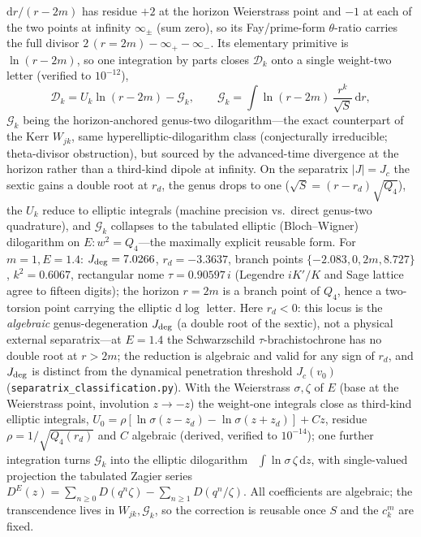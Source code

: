 \documentclass[
    aps, prd, twocolumn, superscriptaddress,
    showpacs, nofootinbib, floatfix
]{revtex4-2}
\newcommand{\Jc}{J_{c}}
\newcommand{\dd}{\mathrm{d}}
\begin{document}
$\dd r/(r-2m)$ has residue $+2$ at the horizon Weierstrass point and $-1$ at each of
the two points at infinity $\infty_\pm$ (sum zero), so its Fay/prime-form
$\theta$-ratio carries the full divisor $2\,(r{=}2m)-\infty_+-\infty_-$. Its
elementary primitive is $\ln(r-2m)$, so one integration by parts closes $\mathcal{D}_k$
onto a single weight-two letter (verified to $10^{-12}$),
\begin{equation}
    \mathcal{D}_k=U_k\ln(r-2m)-\mathcal{G}_k,\qquad
    \mathcal{G}_k=\int\ln(r-2m)\,\frac{r^k}{\sqrt S}\,\dd r,
    \label{eq:horizon-dilog}
\end{equation}
$\mathcal{G}_k$ being the horizon-anchored genus-two dilogarithm---the exact
counterpart of the Kerr $W_{jk}$, same hyperelliptic-dilogarithm class (conjecturally
irreducible; theta-divisor obstruction), but sourced by the advanced-time divergence at the
horizon rather than a third-kind dipole at infinity. On the separatrix $|J|=\Jc$ the
sextic gains a double root at $r_d$, the genus drops to one
($\sqrt S=(r-r_d)\sqrt{Q_4}$), the $U_k$ reduce to elliptic integrals (machine
precision vs.\ direct genus-two quadrature), and $\mathcal{G}_k$ collapses to the
tabulated elliptic (Bloch--Wigner) dilogarithm on $E:w^2=Q_4$---the maximally
explicit reusable form. For $m=1,E=1.4$: $J_{\rm deg}=7.0266$, $r_d=-3.3637$, branch points
$\{-2.083,0,2m,8.727\}$, $k^2=0.6067$, rectangular nome $\tau=0.90597\,i$ (Legendre
$iK'/K$ and Sage lattice agree to fifteen digits); the horizon $r=2m$ is a branch
point of $Q_4$, hence a two-torsion point carrying the elliptic $\dd\log$ letter.
Here $r_d<0$: this locus is the \emph{algebraic} genus-degeneration $J_{\rm deg}$
(a double root of the sextic), not a physical external separatrix---at $E=1.4$ the
Schwarzschild $\tau$-brachistochrone has no double root at $r>2m$; the reduction is
algebraic and valid for any sign of $r_d$, and $J_{\rm deg}$ is distinct from the
dynamical penetration threshold $J_c(v_0)$ (\texttt{separatrix\_classification.py}). With
the Weierstrass $\sigma,\zeta$ of $E$ (base at the Weierstrass point, involution
$z\to-z$) the weight-one integrals close as third-kind elliptic integrals,
$U_0=\rho[\ln\sigma(z-z_d)-\ln\sigma(z+z_d)]+Cz$, residue $\rho=1/\sqrt{Q_4(r_d)}$ and
$C$ algebraic (derived, verified to $10^{-14}$); one further integration turns
$\mathcal{G}_k$ into the elliptic
dilogarithm~\cite{Bloch2000,BeilinsonLevin1994} $\int\ln\sigma\,\zeta\,\dd z$, with
single-valued projection the tabulated Zagier series~\cite{Zagier1990}
$D^E(z)=\sum_{n\ge0}D(q^n\zeta)-\sum_{n\ge1}D(q^n/\zeta)$. All coefficients
are algebraic; the transcendence lives in $W_{jk},\mathcal{G}_k$, so the correction is
reusable once $S$ and the $c_k^m$ are fixed.
\end{document}
